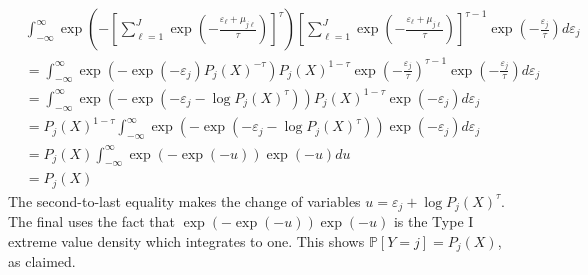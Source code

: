 \documentclass[10pt]{article}
\begin{document}
$$
\begin{aligned}
&\int_{-\infty}^{\infty} \exp \left(-\left[\sum_{\ell=1}^{J} \exp \left(-\frac{\varepsilon_{\ell}+\mu_{j \ell}}{\tau}\right)\right]^{\tau}\right)\left[\sum_{\ell=1}^{J} \exp \left(-\frac{\varepsilon_{\ell}+\mu_{j \ell}}{\tau}\right)\right]^{\tau-1} \exp \left(-\frac{\varepsilon_{j}}{\tau}\right) d \varepsilon_{j} \\
&=\int_{-\infty}^{\infty} \exp \left(-\exp \left(-\varepsilon_{j}\right) P_{j}(X)^{-\tau}\right) P_{j}(X)^{1-\tau} \exp \left(-\frac{\varepsilon_{j}}{\tau}\right)^{\tau-1} \exp \left(-\frac{\varepsilon_{j}}{\tau}\right) d \varepsilon_{j} \\
&=\int_{-\infty}^{\infty} \exp \left(-\exp \left(-\varepsilon_{j}-\log P_{j}(X)^{\tau}\right)\right) P_{j}(X)^{1-\tau} \exp \left(-\varepsilon_{j}\right) d \varepsilon_{j} \\
&=P_{j}(X)^{1-\tau} \int_{-\infty}^{\infty} \exp \left(-\exp \left(-\varepsilon_{j}-\log P_{j}(X)^{\tau}\right)\right) \exp \left(-\varepsilon_{j}\right) d \varepsilon_{j} \\
&=P_{j}(X) \int_{-\infty}^{\infty} \exp (-\exp (-u)) \exp (-u) d u \\
&=P_{j}(X)
\end{aligned}
$$
The second-to-last equality makes the change of variables $u=\varepsilon_{j}+\log P_{j}(X)^{\tau}$. The final uses the fact that $\exp (-\exp (-u)) \exp (-u)$ is the Type I extreme value density which integrates to one. This shows $\mathbb{P}[Y=j]=P_{j}(X)$, as claimed.
\end{document}
